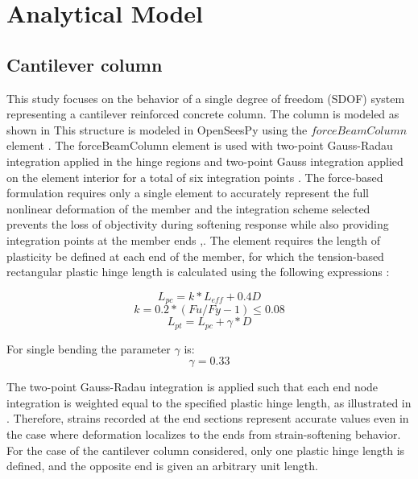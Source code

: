 \section{Analytical Model}

\subsection{Cantilever column}
This study focuses on the behavior of a single degree of freedom (SDOF) system representing a cantilever reinforced concrete column. The column is modeled as shown in  This structure is modeled in OpenSeesPy \cite{McKenna2010}\cite{Zhu2018} using the $forceBeamColumn$ element \cite{Scott}. The forceBeamColumn element is used with two-point Gauss-Radau integration applied in the hinge regions and two-point Gauss integration applied on the element interior for a total of six integration points \cite{Scott}. The force-based formulation requires only a single element to accurately represent the full nonlinear deformation of the member and the integration scheme selected prevents the loss of objectivity during softening response while also providing integration points at the member ends \cite{Calabrese2010},\cite{Scott}. The element requires the length of plasticity be defined at each end of the member, for which the tension-based rectangular plastic hinge length is calculated using the following expressions \cite{Goodnight2013}:

\begin{equation}
    L_{pc}=k*L_{eff} + 0.4D
    \label{eq:LP_Comp}
\end{equation}
\begin{equation}
	k=0.2*(Fu/Fy - 1) \leqslant 0.08
	\label{eq:K_Lp}
\end{equation}
\begin{equation}
    L_{pt}=L_{pc}+\gamma*D
    \label{eq:LP_Tension}
\end{equation}

For single bending the parameter $\gamma$ is:
\begin{equation}
    \gamma=0.33
    \label{eq:Gamma_LPt}
\end{equation}

The two-point Gauss-Radau integration is applied such that each end node integration is weighted equal to the specified plastic hinge length, as illustrated in . Therefore, strains recorded at the end sections represent accurate values even in the case where deformation localizes to the ends from strain-softening behavior. For the case of the cantilever column considered, only one plastic hinge length is defined, and the opposite end is given an arbitrary unit length. 


